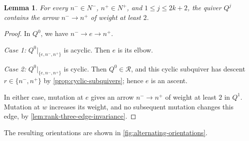 \documentclass[10pt,a4paper]{amsart}
\newtheorem{lemma}[lemma]{Lemma}
\theoremstyle{definition}
\theoremstyle{definition}
\numberwithin{equation}{section}
\numberwithin{table}{section}
\newcommand{\nminus}{N^{-}}
\newcommand{\nplus}{N^{+}}
\newcommand{\Rclass}{\mathcal{R}}
\newcommand{\Qalt}[1]{Q^{#1}}
\begin{document}
\begin{lemma}\label{lem:alternating-nminus-nplus}
For every $n^-\in\nminus$, $n^+\in\nplus$, and $1\le j\le2k+2$, the quiver
$\Qalt{j}$ contains the arrow $n^-\to n^+$ of weight at least $2$.
\end{lemma}

\begin{proof}
In $\Qalt{0}$, we have $n^-\to e\to n^+$.

\emph{Case 1:} $\Qalt{0}|_{\{e,n^-,n^+\}}$ is acyclic.
Then $e$ is its elbow.

\emph{Case 2:} $\Qalt{0}|_{\{e,n^-,n^+\}}$ is cyclic.
Then $\Qalt{0}\in\Rclass$, and this cyclic subquiver has descent
$r\in\{n^-,n^+\}$ by \cref{prop:cyclic-subquivers}; hence $e$ is an
ascent.

In either case,
mutation at $e$ gives an arrow $n^-\to n^+$ of weight at least $2$ in
$\Qalt{1}$. Mutation at $w$ increases its weight, and no subsequent mutation
changes this edge, by \cref{lem:rank-three-edge-invariance}.
\end{proof}

The resulting orientations are shown in \cref{fig:alternating-orientations}.
\end{document}
